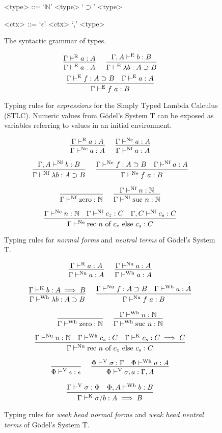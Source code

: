 \documentclass[preprint,authoryear]{sigplanconf}
\def\turnstyle{\vdash}
\def\asc{:}
\def\arr{\supset}
\def\nat{\mathbb{N}}
\def\emp{\epsilon}
\def\zero{\con{zero}}
\newcommand{\suc}[1]{\con{suc}~#1}
\newcommand{\rec}[3]{\con{rec}~#1~\con{of}~#2~\con{else}~#3}
\newcommand{\con}[1]{\textmd{#1}}
\newcommand{\turn}[1]{\turnstyle^\con{#1}}
\newcommand{\typr}[2]{\Gamma \turn{R}  #1 \asc #2}
\newcommand{\type}[2]{\ctype{\Gamma}{#1}{#2}}
\newcommand{\ctype}[3]{#1 \turn{E}  #2 \asc #3}
\newcommand{\typnf}[2]{\ctypnf{\Gamma}{#1}{#2}}
\newcommand{\ctypnf}[3]{#1 \turn{Nf}  #2 \asc #3}
\newcommand{\typne}[2]{\Gamma \turn{Ne}  #1 \asc #2}
\newcommand{\typk}[3]{\Gamma \turn{K}  #1 \asc #2 \implies #3}
\newcommand{\typv}[3]{#1 \turn{V}  #2 \asc #3}
\newcommand{\typwh}[2]{\ctypwh{\Gamma}{#1}{#2}}
\newcommand{\ctypwh}[3]{#1 \turn{Wh}  #2 \asc #3}
\newcommand{\typnu}[2]{\Gamma \turn{Nu}  #1 \asc #2}
\begin{document}
\begin{figure}[t!]
\caption{
The syntactic grammar of types.
}
\begin{grammar}
<type> ::= `\(\nat\)'
\alt <type> `\(\arr\)' <type>

<ctx> ::= `\(\emp\)'
\alt <ctx> `,' <type>
\end{grammar}
\label{fig:gram:type}
\end{figure}

\begin{figure}[t!]
\caption{
Typing rules for \textit{expressions} for the Simply Typed Lambda
Calculus (STLC). Numeric values from G{\"o}del's System T can be
exposed as variables referring to values in an initial environment.
}
$$
\infer
  []
  {\type{a}{A}}
{
  \typr{a}{A}
}
\quad
\infer
  []
  {\type{\lambda b}{A \arr B}}
{
  \ctype{\Gamma, A}{b}{B}
}
$$
$$
\infer
  []
  {\type{f~a}{B}}
{
  \type{f}{A \arr B}
  &
  \type{a}{A}
}
$$
\label{fig:type:exp}
\end{figure}

\begin{figure}[t!]
\caption{
Typing rules for \textit{normal forms} and \textit{neutral terms} of G{\"o}del's System T.
}
$$
\infer
  []
  {\typne{a}{A}}
{
  \typr{a}{A}
}
\quad
\infer
  []
  {\typnf{a}{A}}
{
  \typne{a}{A}
}
$$

$$
\infer
  []
  {\typnf{\lambda b}{A \arr B}}
{
  \ctypnf{\Gamma, A}{b}{B}
}
\quad
\infer
  []
  {\typne{f~a}{B}}
{
  \typne{f}{A \arr B}
  &
  \typnf{a}{A}
}
$$

$$
\infer
  []
  {\typnf{\zero}{\nat}}
{
}
\quad
\infer
  []
  {\typnf{\suc{n}}{\nat}}
{
  \typnf{n}{\nat}
}
$$

$$
\infer
  []
  {\typne{\rec{n}{c_z}{c_s}}{C}}
{
  \typne{n}{\nat}
  &
  \typnf{c_z}{C}
  &
  \ctypnf{\Gamma, C}{c_s}{C}
}
$$

\label{fig:type:nf}
\end{figure}

\begin{figure}[t!]
\caption{
Typing rules for \textit{weak head normal forms} and
\textit{weak head neutral terms} of G{\"o}del's System T.
}

$$
\infer
  []
  {\typnu{a}{A}}
{
  \typr{a}{A}
}
\quad
\infer
  []
  {\typwh{a}{A}}
{
  \typnu{a}{A}
}
$$

$$
\infer
  []
  {\typwh{\lambda b}{A \arr B}}
{
  \typk{b}{A}{B}
}
\quad
\infer
  []
  {\typnu{f~a}{B}}
{
  \typnu{f}{A \arr B}
  &
  \typwh{a}{A}
}
$$

$$
\infer
  []
  {\typwh{\zero}{\nat}}
{
}
\quad
\infer
  []
  {\typwh{\suc{n}}{\nat}}
{
  \typwh{n}{\nat}
}
$$

$$
\infer
  []
  {\typnu{\rec{n}{c_z}{c_s}}{C}}
{
  \typnu{n}{\nat}
  &
  \typwh{c_z}{C}
  &
  \typk{c_s}{C}{C}
}
$$

$$
\infer
  []
  {\typv{\Phi}{\emp}{\emp}}
{
}
\quad
\infer
  []
  {\typv{\Phi}{\sigma, a}{\Gamma, A}}
{
  \typv{\Phi}{\sigma}{\Gamma}
  &
  \ctypwh{\Phi}{a}{A}
}
$$

$$
\infer
  []
  {\typk{\sigma / b}{A}{B}}
{
  \typv{\Gamma}{\sigma}{\Phi}
  &
  \ctypwh{\Phi, A}{b}{B}
}
$$

\label{fig:type:wh}
\end{figure}
\end{document}
